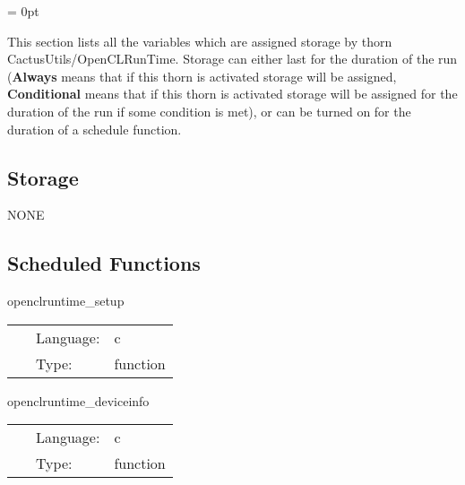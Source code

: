 \parskip = 0pt


\noindent This section lists all the variables which are assigned storage by thorn CactusUtils/OpenCLRunTime.  Storage can either last for the duration of the run ({\bf Always} means that if this thorn is activated storage will be assigned, {\bf Conditional} means that if this thorn is activated storage will be assigned for the duration of the run if some condition is met), or can be turned on for the duration of a schedule function.


\subsection*{Storage}NONE
\subsection*{Scheduled Functions}
\vspace{5mm}


\hspace{5mm} openclruntime\_setup 

\hspace{5mm}{\it set up opencl device } 


\hspace{5mm}

 \begin{tabular*}{160mm}{cll} 
~ & Language:  & c \\ 
~ & Type:  & function \\ 
\end{tabular*} 


\vspace{5mm}


\hspace{5mm} openclruntime\_deviceinfo 

\hspace{5mm}{\it output opencl device information } 


\hspace{5mm}

 \begin{tabular*}{160mm}{cll} 
~ & Language:  & c \\ 
~ & Type:  & function \\ 
\end{tabular*} 


\vspace{5mm}

